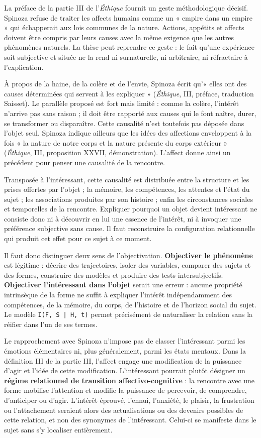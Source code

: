 \documentclass[10pt,a4paper]{article}
\begin{document}
La préface de la partie III de l'\emph{Éthique} fournit un geste méthodologique décisif. Spinoza refuse de traiter les affects humains comme un « empire dans un empire » qui échapperait aux lois communes de la nature. Actions, appétits et affects doivent être compris par leurs causes avec la même exigence que les autres phénomènes naturels. La thèse peut reprendre ce geste : le fait qu'une expérience soit subjective et située ne la rend ni surnaturelle, ni arbitraire, ni réfractaire à l'explication.

À propos de la haine, de la colère et de l'envie, Spinoza écrit qu'« elles ont des causes déterminées qui servent à les expliquer » (\emph{Éthique}, III, préface, traduction Saisset). Le parallèle proposé est fort mais limité : comme la colère, l'intérêt n'arrive pas sans raison ; il doit être rapporté aux causes qui le font naître, durer, se transformer ou disparaître. Cette causalité n'est toutefois pas déposée dans l'objet seul. Spinoza indique ailleurs que les idées des affections enveloppent à la fois « la nature de notre corps et la nature présente du corps extérieur » (\emph{Éthique}, III, proposition XXVII, démonstration). L'affect donne ainsi un précédent pour penser une causalité de la rencontre.

Transposée à l'intéressant, cette causalité est distribuée entre la structure et les prises offertes par l'objet ; la mémoire, les compétences, les attentes et l'état du sujet ; les associations produites par son histoire ; enfin les circonstances sociales et temporelles de la rencontre. Expliquer pourquoi un objet devient intéressant ne consiste donc ni à découvrir en lui une essence de l'intérêt, ni à invoquer une préférence subjective sans cause. Il faut reconstruire la configuration relationnelle qui produit cet effet pour ce sujet à ce moment.

Il faut donc distinguer deux sens de l'objectivation. \textbf{Objectiver le phénomène} est légitime : décrire des trajectoires, isoler des variables, comparer des sujets et des formes, construire des modèles et produire des tests intersubjectifs. \textbf{Objectiver l'intéressant dans l'objet} serait une erreur : aucune propriété intrinsèque de la forme ne suffit à expliquer l'intérêt indépendamment des compétences, de la mémoire, du corps, de l'histoire et de l'horizon social du sujet. Le modèle \texttt{I(F, S | H, t)} permet précisément de naturaliser la relation sans la réifier dans l'un de ses termes.

Le rapprochement avec Spinoza n'impose pas de classer l'intéressant parmi les émotions élémentaires ni, plus généralement, parmi les états mentaux. Dans la définition III de la partie III, l'affect engage une modification de la puissance d'agir et l'idée de cette modification. L'intéressant pourrait plutôt désigner un \textbf{régime relationnel de transition affectivo-cognitive} : la rencontre avec une forme mobilise l'attention et modifie la puissance de percevoir, de comprendre, d'anticiper ou d'agir. L'intérêt éprouvé, l'ennui, l'anxiété, le plaisir, la frustration ou l'attachement seraient alors des actualisations ou des devenirs possibles de cette relation, et non des synonymes de l'intéressant. Celui-ci se manifeste dans le sujet sans s'y localiser entièrement.
\end{document}
